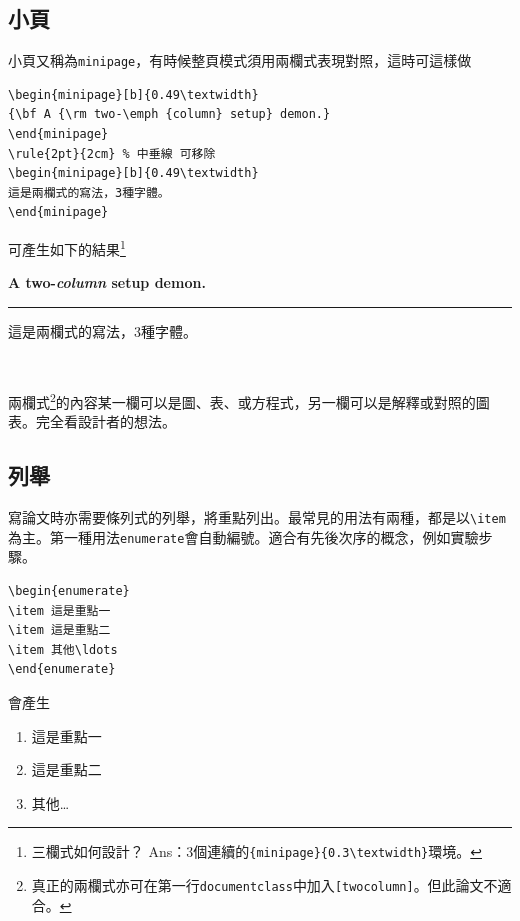 \subsection{小頁}
小頁又稱為{\tt minipage}，有時候整頁模式須用兩欄式表現對照，這時可這樣做
\begin{Verbatim}[frame=single, firstline=1,label=Minipage]
\begin{minipage}[b]{0.49\textwidth}
{\bf A {\rm two-\emph {column} setup} demon.}
\end{minipage}
\rule{2pt}{2cm} % 中垂線 可移除
\begin{minipage}[b]{0.49\textwidth}
這是兩欄式的寫法，3種字體。
\end{minipage}
\end{Verbatim}
可產生如下的結果\footnote{三欄式如何設計？ Ans：3個連續的{\tt \{minipage\}\{0.3\textbackslash textwidth\}}環境。}\\
\begin{minipage}[b]{0.49\textwidth} 
{\bf A {\rm two-\emph {column} setup} demon.}  
\end{minipage}
\rule{2pt}{2cm}%
\begin{minipage}[b]{0.49\textwidth}
這是兩欄式的寫法，3種字體。
\end{minipage}\\ 

兩欄式\footnote{真正的兩欄式亦可在第一行{\tt documentclass}中加入{\tt [twocolumn]}。但此論文不適合。}的內容某一欄可以是圖、表、或方程式，另一欄可以是解釋或對照的圖表。完全看設計者的想法。

\subsection{列舉} 
寫論文時亦需要條列式的列舉，將重點列出。最常見的用法有兩種，都是以\verb+\item+為主。第一種用法{\tt enumerate}會自動編號。適合有先後次序的概念，例如實驗步驟。
\begin{Verbatim}[frame=single,firstline=1,label=Enumerate]
\begin{enumerate}
\item 這是重點一
\item 這是重點二
\item 其他\ldots
\end{enumerate}
\end{Verbatim}
會產生
\begin{enumerate}
\item 這是重點一
\item 這是重點二
\item 其他\ldots
\end{enumerate}

